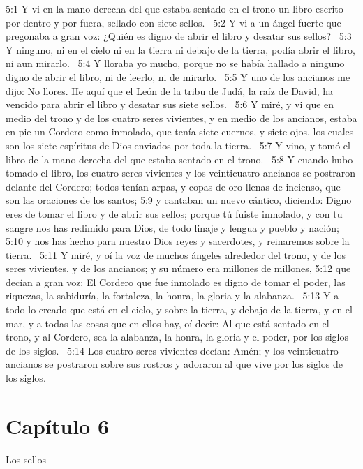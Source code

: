 5:1 Y vi en la mano derecha del que estaba sentado en el trono un libro escrito por dentro y por fuera, sellado con siete sellos.  
5:2 Y vi a un ángel fuerte que pregonaba a gran voz: ¿Quién es digno de abrir el libro y desatar sus sellos?  
5:3 Y ninguno, ni en el cielo ni en la tierra ni debajo de la tierra, podía abrir el libro, ni aun mirarlo.  
5:4 Y lloraba yo mucho, porque no se había hallado a ninguno digno de abrir el libro, ni de leerlo, ni de mirarlo.  
5:5 Y uno de los ancianos me dijo: No llores. He aquí que el León de la tribu de Judá, la raíz de David, ha vencido para abrir el libro y desatar sus siete sellos.  
5:6 Y miré, y vi que en medio del trono y de los cuatro seres vivientes, y en medio de los ancianos, estaba en pie un Cordero como inmolado, que tenía siete cuernos, y siete ojos, los cuales son los siete espíritus de Dios enviados por toda la tierra.  
5:7 Y vino, y tomó el libro de la mano derecha del que estaba sentado en el trono.  
5:8 Y cuando hubo tomado el libro, los cuatro seres vivientes y los veinticuatro ancianos se postraron delante del Cordero; todos tenían arpas, y copas de oro llenas de incienso, que son las oraciones de los santos; 
5:9 y cantaban un nuevo cántico, diciendo: Digno eres de tomar el libro y de abrir sus sellos; porque tú fuiste inmolado, y con tu sangre nos has redimido para Dios, de todo linaje y lengua y pueblo y nación;  
5:10 y nos has hecho para nuestro Dios reyes y sacerdotes, y reinaremos sobre la tierra.  
5:11 Y miré, y oí la voz de muchos ángeles alrededor del trono, y de los seres vivientes, y de los ancianos; y su número era millones de millones, 
5:12 que decían a gran voz: El Cordero que fue inmolado es digno de tomar el poder, las riquezas, la sabiduría, la fortaleza, la honra, la gloria y la alabanza.  
5:13 Y a todo lo creado que está en el cielo, y sobre la tierra, y debajo de la tierra, y en el mar, y a todas las cosas que en ellos hay, oí decir: Al que está sentado en el trono, y al Cordero, sea la alabanza, la honra, la gloria y el poder, por los siglos de los siglos.  
5:14 Los cuatro seres vivientes decían: Amén; y los veinticuatro ancianos se postraron sobre sus rostros y adoraron al que vive por los siglos de los siglos.  
\section*{Capítulo 6 }
Los sellos  


